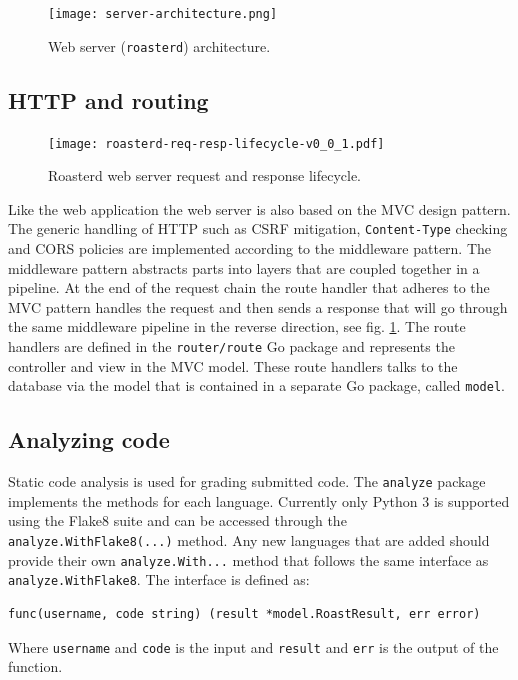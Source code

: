 \documentclass[12pt,a4paper]{report}
\begin{document}
\begin{figure}[H]
  \centering
  \texttt{[image: server-architecture.png]}
  \caption{Web server (\texttt{roasterd}) architecture.}
\end{figure}

\subsection{HTTP and routing}
\begin{figure}[H]
  \centering
  \texttt{[image: roasterd-req-resp-lifecycle-v0\_0\_1.pdf]}
  \caption{Roasterd web server request and response lifecycle.}
  \label{fig:roasterd-lifecycle}
\end{figure}

Like the web application the web server is also based on the MVC design pattern. The generic handling of HTTP such as CSRF mitigation, \texttt{Content-Type} checking and CORS policies are implemented according to the middleware pattern. The middleware pattern abstracts parts into layers that are coupled together in a pipeline. At the end of the request chain the route handler that adheres to the MVC pattern handles the request and then sends a response that will go through the same middleware pipeline in the reverse direction, see fig. \ref{fig:roasterd-lifecycle}. The route handlers are defined in the \texttt{router/route}\cite{roaster-router-route} Go package and represents the controller and view in the MVC model. These route handlers talks to the database via the model that is contained in a separate Go package, called \texttt{model}\cite{roaster-model}.

\subsection{Analyzing code}
Static code analysis is used for grading submitted code. The \texttt{analyze} package implements the methods for each language. Currently only Python 3 is supported using the Flake8 suite and can be accessed through the \texttt{analyze.WithFlake8(...)}\cite{roasterd-analyze-withflake8} method. Any new languages that are added should provide their own \texttt{analyze.With...} method that follows the same interface as \texttt{analyze.WithFlake8}. The interface is defined as:
\begin{verbatim}
func(username, code string) (result *model.RoastResult, err error)
\end{verbatim}
Where \texttt{username} and \texttt{code} is the input and \texttt{result} and \texttt{err} is the output of the function.
\end{document}
